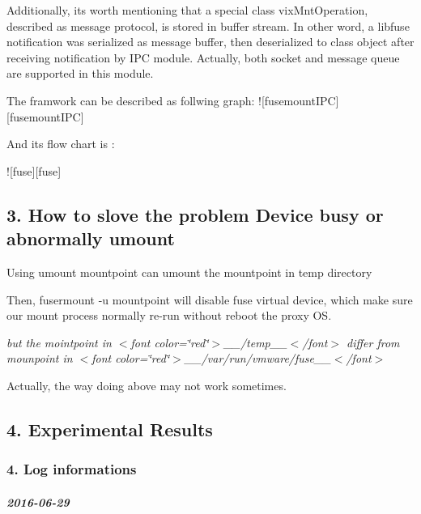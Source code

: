 Additionally, it\textquotesingle{}s worth mentioning that a special class vix\+Mnt\+Operation, described as message protocol, is stored in buffer stream. In other word, a libfuse notification was serialized as message buffer, then deserialized to class object after receiving notification by I\+PC module. Actually, both socket and message queue are supported in this module.

The framwork can be described as follwing graph\+: !\mbox{[}fusemount\+I\+PC\mbox{]}\mbox{[}fusemount\+I\+PC\mbox{]}

And its flow chart is \+:

!\mbox{[}fuse\mbox{]}\mbox{[}fuse\mbox{]}



 \subsection*{3. How to slove the problem Device busy or abnormally umount}


\begin{DoxyEnumerate}
\item Using {\ttfamily umount mountpoint} can umount the mountpoint in temp directory
\item Then, {\ttfamily fusermount -\/u mountpoint} will disable fuse virtual device, which make sure our mount process normally re-\/run without reboot the proxy OS.

{\itshape but the mointpoint in $<$font color=\char`\"{}red\char`\"{}$>$\+\_\+\+\_\+/temp\+\_\+\+\_\+$<$/font$>$ differ from mounpoint in $<$font color=\char`\"{}red\char`\"{}$>$\+\_\+\+\_\+/var/run/vmware/fuse\+\_\+\+\_\+$<$/font$>$}
\end{DoxyEnumerate}
\begin{DoxyItemize}
\item Actually, the way doing above may not work sometimes. 


\end{DoxyItemize}

\subsection*{4. Experimental Results}

\subsubsection*{4. Log informations}

\subparagraph*{2016-\/06-\/29}

